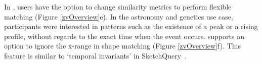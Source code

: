 In \zvpp, users have the option to change 
similarity metrics to perform 
flexible matching (Figure \ref{zvOverview}e). 
In the astronomy and genetics use case, 
participants were interested in patterns 
such as the existence of a peak or a rising profile, 
without regards to the exact time when the event occurs. 
\zvpp supports an option to ignore 
the x-range in shape matching (Figure \ref{zvOverview}f). 
This feature is similar to `temporal invariants' in SketchQuery~\cite{correll2016semantics}.

